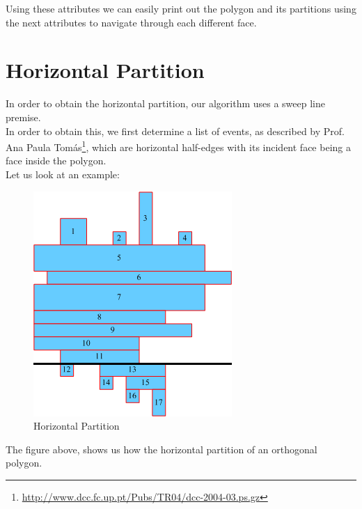 \documentclass[12pt,a4paper,oneside]{article}
\begin{document}

Using these attributes we can easily print out the polygon and its partitions using the next attributes to navigate through each different face.

\pagebreak

\section{Horizontal Partition}\label{sec:hor}
In order to obtain the horizontal partition, our algorithm uses a sweep line premise.\\ 
In order to obtain this, we first determine a list of events, as described by Prof. Ana Paula Tomás\footnote{\url{http://www.dcc.fc.up.pt/Pubs/TR04/dcc-2004-03.ps.gz}}, which are horizontal half-edges with its incident face being a face inside the polygon. \\
Let us look at an example:

\begin{figure}[h!]
  \centering \includegraphics[scale=0.5]{horPartition.png}
  \caption{Horizontal Partition}
  \label{fig:hor}
\end{figure}


The figure above, shows us how the horizontal partition of an orthogonal polygon.
\end{document}
